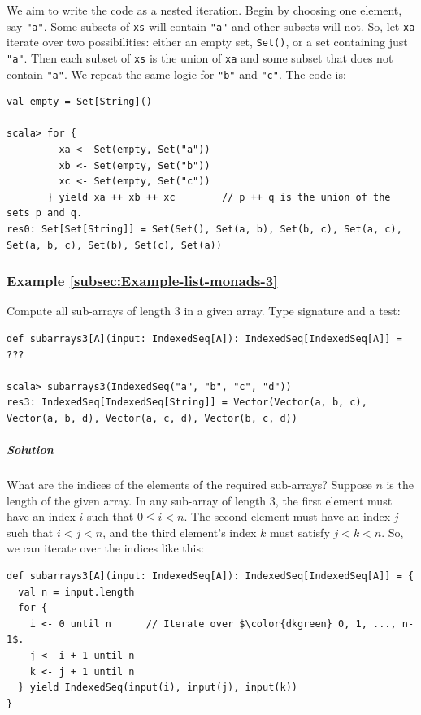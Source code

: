 We aim to write the code as a nested iteration. Begin by choosing
one element, say \lstinline!"a"!. Some subsets of \lstinline!xs!
will contain \lstinline!"a"! and other subsets will not. So, let
\lstinline!xa! iterate over two possibilities: either an empty set,
\lstinline!Set()!, or a set containing just \lstinline!"a"!. Then
each subset of \lstinline!xs! is the union of \lstinline!xa! and
some subset that does not contain \lstinline!"a"!. We repeat the
same logic for \lstinline!"b"! and \lstinline!"c"!. The code is:
\begin{lstlisting}
val empty = Set[String]()

scala> for {
         xa <- Set(empty, Set("a"))
         xb <- Set(empty, Set("b"))
         xc <- Set(empty, Set("c"))
       } yield xa ++ xb ++ xc        // p ++ q is the union of the sets p and q.
res0: Set[Set[String]] = Set(Set(), Set(a, b), Set(b, c), Set(a, c), Set(a, b, c), Set(b), Set(c), Set(a))
\end{lstlisting}


\subsubsection{Example \label{subsec:Example-list-monads-3}\ref{subsec:Example-list-monads-3}}

Compute all sub-arrays of length $3$ in a given array. Type signature
and a test:
\begin{lstlisting}
def subarrays3[A](input: IndexedSeq[A]): IndexedSeq[IndexedSeq[A]] = ???

scala> subarrays3(IndexedSeq("a", "b", "c", "d"))
res3: IndexedSeq[IndexedSeq[String]] = Vector(Vector(a, b, c), Vector(a, b, d), Vector(a, c, d), Vector(b, c, d))
\end{lstlisting}


\subparagraph{Solution}

What are the indices of the elements of the required sub-arrays? Suppose
$n$ is the length of the given array. In any sub-array of length
$3$, the first element must have an index $i$ such that $0\leq i<n$.
The second element must have an index $j$ such that $i<j<n$, and
the third element\textsf{'}s index $k$ must satisfy $j<k<n$. So, we can iterate
over the indices like this:
\begin{lstlisting}[mathescape=true]
def subarrays3[A](input: IndexedSeq[A]): IndexedSeq[IndexedSeq[A]] = {
  val n = input.length
  for {
    i <- 0 until n      // Iterate over $\color{dkgreen} 0, 1, ..., n-1$.
    j <- i + 1 until n
    k <- j + 1 until n
  } yield IndexedSeq(input(i), input(j), input(k))
}
\end{lstlisting}



